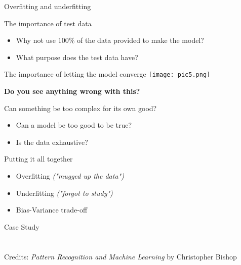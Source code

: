 \documentclass{beamer}
\begin{document}
\begin{frame}{}
    Overfitting and underfitting
\end{frame}



\begin{frame}{The importance of test data}
    \begin{itemize}
        \item Why not use $100\%$ of the data provided to make the model? 
        \item What purpose does the test data have?
    \end{itemize}
    
\end{frame}


\begin{frame}{The importance of letting the model converge}
    \texttt{[image: pic5.png]}

    \textbf{Do you see anything wrong with this?}

\end{frame}

\begin{frame}{Can something be too complex for its own good?}
    \begin{itemize}
        \item Can a model be too good to be true? 
        \item Is the data exhaustive?
    \end{itemize}
\end{frame}

\begin{frame}{Putting it all together}
\begin{itemize}
    \item Overfitting \textit{("mugged up the data")}
    \item Underfitting \textit{("forgot to study")}
    \item Bias-Variance trade-off
    
\end{itemize}
\end{frame}

\begin{frame}
    Case Study 
    \\ 
    \\ 
    \\ 
    Credits: \textit{Pattern Recognition and Machine Learning} by Christopher Bishop
\end{frame}
\end{document}
